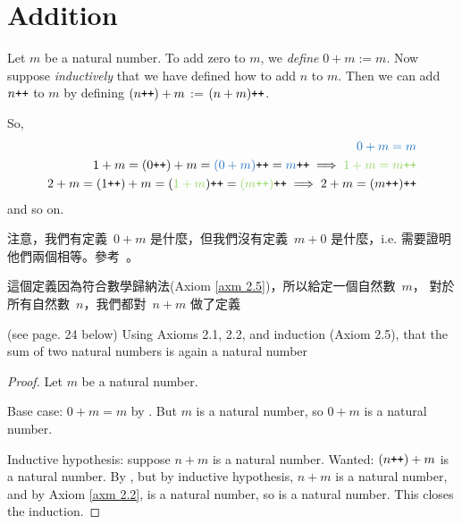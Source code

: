 \section{Addition}\label{sec 2.2}

\begin{definition}  \label{def 2.2.1} Let \(m\) be a natural number. To add zero to \(m\), we \emph{define} \(0 + m := m\). Now suppose \emph{inductively} that we have defined how to add \(n\) to \(m\). Then we can add \(n\texttt{++} \) to \(m\) by defining \((n\texttt{++}) + m\) := \((n + m)\texttt{++}\).
\end{definition}
\begin{note}
So,
\begin{align*}
\BLUE{0 + m = m}\\
1 + m = (0\INC) + m = \BLUE{(0 + m)}\INC = \BLUE{m}\INC \implies \GREEN{1 + m = m\INC} \\
2 + m = (1\INC) + m = (\GREEN{1 + m})\INC = \GREEN{(m\INC)}\INC \implies 2 + m = (m\INC)\INC
\end{align*}
and so on.
\end{note}
\begin{note}
注意，我們有定義\ \(0 + m\) 是什麼，但我們沒有定義\ \(m + 0\) 是什麼，i.e. 需要證明他們兩個相等。參考\ 。
\end{note}
\begin{note}
這個定義因為符合數學歸納法(Axiom \ref{axm 2.5})，所以給定一個自然數\ \(m\)， 對於所有自然數\ \(n\)，我們都對\ \(n + m\) 做了定義
\end{note}

\begin{additional corollary}\label{ac 2.2.1} (see page. 24 below) Using Axioms 2.1, 2.2, and induction (Axiom 2.5), that the sum of two natural numbers is again a natural number 
\end{additional corollary}
\begin{proof}
Let \(m\) be a natural number.

Base case: \(0 + m = m\) by . But \(m\) is a natural number, so \(0 + m\) is a natural number. 

Inductive hypothesis: suppose \(n + m\) is a natural number. Wanted: \((n\texttt{++}) + m\) is a natural number. By  , but by inductive hypothesis, \(n + m\) is a natural number, and by Axiom \ref{axm 2.2},  is a natural number, so  is a natural number. This closes the induction.
\end{proof}

